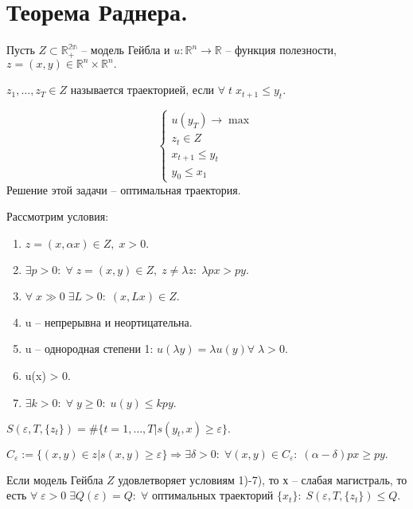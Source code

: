 \chapter{Теорема Раднера.}\label{cha:18}

Пусть $Z \subset \mathbb{R^{2n}_+}$ -- модель Гейбла и $u: \mathbb{R}^n \to \mathbb{R}$ -- функция полезности, $z = (x, y) \in \mathbb{R}^n \times \mathbb{R}^n.$

$z_1, \ldots, z_T \in Z$ называется траекторией, если $\forall \; t \; x_{t + 1} \leq y_t.$

\begin{problem}
	$$\begin{cases}
		u(y_T) \to \max\\
		z_t \in Z\\
		x_{t + 1} \leq y_t\\
		y_0 \leq x_1
	\end{cases}$$ Решение этой задачи -- оптимальная траектория. 
\end{problem}

Рассмотрим условия:

\begin{enumerate}
	\item $ z = (x, \alpha x) \in Z, \; x > 0.$
	\item $\exists p > 0: \; \forall \; z = (x, y) \in Z, \; z \neq \lambda z: \; \lambda p x > py.$
	\item $\forall \; x \gg 0 \; \exists L > 0: \; (x, Lx) \in Z.$
	\item u -- непрерывна и неортицательна.
	\item u -- однородная степени 1: $u(\lambda y) = \lambda u(y) \forall \; \lambda > 0.$
	\item u(x) > 0.
	\item $\exists k > 0: \; \forall \; y \geq 0: \; u(y) \leq kpy.$
\end{enumerate}

\begin{sign}
	$S(\varepsilon, T, \{ z_t \}) = \#\{ t = 1, \ldots, T | s(y_t, x) \geq \varepsilon \}.$
\end{sign}

\begin{lemma}
	$C_{\varepsilon} := \{ (x, y) \in z | s(x, y) \geq \varepsilon \} \Rightarrow \exists \delta > 0: \; \forall (x,y) \in C_{\varepsilon}: \; (\alpha - \delta)px \geq py.$
\end{lemma}

\begin{theorem}[Раднера]
	Если модель Гейбла $Z$ удовлетворяет условиям 1)-7), то х -- слабая магистраль, то есть $\forall \; \varepsilon > 0 \; \exists Q(\varepsilon) = Q: \; \forall$ оптимальных траекторий $\{ x_t \}: \; S(\varepsilon, T, \{ z_t \}) \leq Q.$
\end{theorem}